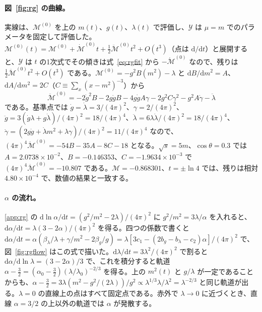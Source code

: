 \documentclass[a4paper,10pt]{ltjsarticle}
\newcommand{\dd}{\mathrm{d}}
\begin{document}
\paragraph{図~\ref{fig:rg} の曲線。}実線は、$\mathcal{M}^{(0)}$ を上の $m(t)$、$g(t)$、$\lambda(t)$ で評価し、$\mathcal{Y}$ は $\mu=m$ でのパラメータを固定して評価した。$\mathcal{M}^{(0)}(t)=\mathcal{M}^{(0)}+\dot{\mathcal{M}}^{(0)}t+\frac12\ddot{\mathcal{M}}^{(0)}t^2+O(t^3)$（点は $\dd/\dd t$）と展開すると、$\mathcal{Y}$ は $t$ の1次式でその傾きは式~\eqref{eq:rgfit} から $-\dot{\mathcal{M}}^{(0)}$ なので、残りは $\frac12\ddot{\mathcal{M}}^{(0)}t^2+O(t^3)$ である。$\mathcal{M}^{(0)}=-g^2B(m^2)-\lambda$ と $\dd B/\dd m^2=A$、$\dd A/\dd m^2=2C$（$C\equiv\sum_x(x-m^2)^{-3}$）から
\begin{equation*}
\ddot{\mathcal{M}}^{(0)}=-2\dot g^2B-2g\ddot gB-4g\dot gA\gamma-2g^2C\gamma^2-g^2A\dot\gamma-\ddot\lambda
\end{equation*}
である。基準点では $\dot g=\dot\lambda=3/(4\pi)^2$、$\gamma=2/(4\pi)^2$、$\ddot g=3(\dot g\lambda+g\dot\lambda)/(4\pi)^2=18/(4\pi)^4$、$\ddot\lambda=6\lambda\dot\lambda/(4\pi)^2=18/(4\pi)^4$、$\dot\gamma=(2g\dot g+\dot\lambda m^2+\lambda\gamma)/(4\pi)^2=11/(4\pi)^4$ なので、$(4\pi)^4\ddot{\mathcal{M}}^{(0)}=-54B-35A-8C-18$ となる。$\sqrt s=5m$、$\cos\theta=0.3$ では $A=2.0738\times10^{-2}$、$B=-0.146353$、$C=-1.9634\times10^{-3}$ で $(4\pi)^4\ddot{\mathcal{M}}^{(0)}=-10.807$ である。$\mathcal{M}=-0.868301$、$t=\pm\ln4$ では、残りは相対 $4.80\times10^{-4}$ で、数値の結果と一致する。

\paragraph{$\alpha$ の流れ。}\ref{app:rg} の $\dd\ln\alpha/\dd t=(g^2/m^2-2\lambda)/(4\pi)^2$ に $g^2/m^2=3\lambda/\alpha$ を入れると、$\dd\alpha/\dd t=\lambda(3-2\alpha)/(4\pi)^2$ を得る。四つの係数で書くと $\dd\alpha/\dd t=\alpha(\beta_\lambda/\lambda+\gamma/m^2-2\beta_g/g)=\lambda[3c_1-(2b_g-b_\lambda-c_2)\alpha]/(4\pi)^2$ で、図~\ref{fig:rgflow} はこの式で描いた。$\dd\lambda/\dd t=3\lambda^2/(4\pi)^2$ で割ると $\dd\alpha/\dd\ln\lambda=(3-2\alpha)/3$ で、これを積分すると軌道 $\alpha-\frac32=(\alpha_0-\frac32)(\lambda/\lambda_0)^{-2/3}$ を得る。上の $m^2(t)$ と $g/\lambda$ が一定であることからも、$\alpha-\frac32=3\lambda(m^2-g^2/(2\lambda))/g^2\propto\lambda^{1/3}\lambda/\lambda^2=\lambda^{-2/3}$ と同じ軌道が出る。$\lambda=0$ の直線上の点はすべて固定点である。赤外で $\lambda\to0$ に近づくとき、直線 $\alpha=3/2$ の上以外の軌道では $\alpha$ が発散する。
\end{document}
